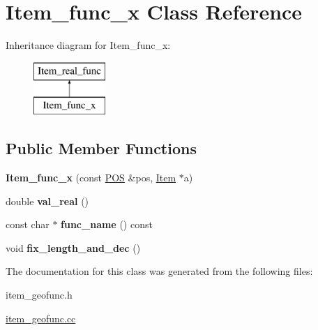 \hypertarget{classItem__func__x}{}\section{Item\+\_\+func\+\_\+x Class Reference}
\label{classItem__func__x}
Inheritance diagram for Item\+\_\+func\+\_\+x\+:\begin{figure}[H]
\begin{center}
\leavevmode
\includegraphics[height=2.000000cm]{classItem__func__x}
\end{center}
\end{figure}
\subsection*{Public Member Functions}
\begin{DoxyCompactItemize}
\item 
\mbox{\label{classItem__func__x_a5bead19aff13ae71dff6dce4bd7d7b55}} 
{\bfseries Item\+\_\+func\+\_\+x} (const \mbox{\hyperlink{structYYLTYPE}{P\+OS}} \&pos, \mbox{\hyperlink{classItem}{Item}} $\ast$a)
\item 
\mbox{\label{classItem__func__x_acef897a3d93a5af94198e5f6245a3b8a}} 
double {\bfseries val\+\_\+real} ()
\item 
\mbox{\label{classItem__func__x_a00e34d9f24911e653ab1b22da6c91650}} 
const char $\ast$ {\bfseries func\+\_\+name} () const
\item 
\mbox{\label{classItem__func__x_ae3ebc564b40e3f2f2bc862c26a8c43e2}} 
void {\bfseries fix\+\_\+length\+\_\+and\+\_\+dec} ()
\end{DoxyCompactItemize}


The documentation for this class was generated from the following files\+:\begin{DoxyCompactItemize}
\item 
item\+\_\+geofunc.\+h\item 
\mbox{\hyperlink{item__geofunc_8cc}{item\+\_\+geofunc.\+cc}}\end{DoxyCompactItemize}

